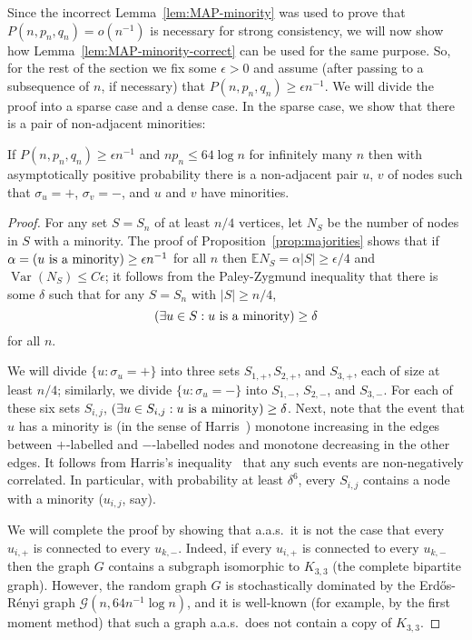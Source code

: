 \documentclass[EJP]{ejpecp}
\newcommand{\E}{\mathbb{E}}
\newcommand{\1}[1]{\mathbbm{1}_{\{#1\}}}
\newcommand{\calG}{\mathcal{G}}
\let\Pr\relax
\DeclareMathOperator{\Pr}{Pr}
\DeclareMathOperator{\Var}{Var}
\begin{document}
Since the incorrect Lemma~\ref{lem:MAP-minority} was used to prove that
$P(n, p_n, q_n) = o(n^{-1})$ is necessary for strong consistency, we will now show
how Lemma~\ref{lem:MAP-minority-correct} can be used for the same purpose.
So, for the rest of the section we fix some $\epsilon > 0$ and assume (after passing
to a subsequence of $n$, if necessary) that $P(n, p_n, q_n) \ge \epsilon n^{-1}$.
We will divide the proof into a sparse case and a dense case. In the sparse case,
we show that there is a pair of non-adjacent minorities:

\begin{lemma}\label{lem:erratum-sparse}
    If $P(n, p_n, q_n) \ge \epsilon n^{-1}$ and $n p_n \le 64 \log n$ for
    infinitely many $n$ then with asymptotically positive probability there is
    a non-adjacent pair $u$, $v$ of nodes such that $\sigma_u = +$, $\sigma_v =
    -$, and $u$ and $v$ have minorities.
\end{lemma}

\begin{proof}
    For any set $S = S_n$ of at least $n/4$ vertices, let $N_S$ be the number
    of nodes in $S$ with a minority. The proof of Proposition~\ref{prop:majorities}
    shows that if $\alpha = \Pr(u \text{ is a minority}) \ge \epsilon n^{-1}$
    for all $n$ then $\E N_S = \alpha |S| \ge \epsilon / 4$ and $\Var(N_S) \le C \epsilon$;
    it follows from the Paley-Zygmund inequality that there is some $\delta$ such
    that for any $S = S_n$ with $|S| \ge n/4$,
    \[
        \Pr(\exists u \in S: u \text{ is a minority}) \ge \delta
    \]
    for all $n$.

    We will divide $\{u: \sigma_u = +\}$ into three sets $S_{1,+}, S_{2,+}$,
    and $S_{3,+}$, each of size at least $n/4$; similarly, we divide $\{u: \sigma_u = -\}$
    into $S_{1,-}$, $S_{2,-}$, and $S_{3,-}$. For each of these six sets $S_{i,j}$,
    $\Pr(\exists u \in S_{i,j}: u \text{ is a minority}) \ge \delta$.
    Next, note that the event
    that $u$ has a minority is (in the sense of Harris~\cite{Harris:60})
    monotone increasing in the edges between $+$-labelled and $-$-labelled nodes
    and monotone decreasing in the other edges. It follows from Harris's
    inequality~\cite{Harris:60} that any such events are non-negatively correlated.
    In particular, with probability at least $\delta^6$, every $S_{i,j}$ contains a
    node with a minority ($u_{i,j}$, say).
    
    We will complete the proof by showing that a.a.s.\ it is not the case that
    every $u_{i,+}$ is connected to every $u_{k,-}$.  Indeed, if every
    $u_{i,+}$ is connected to every $u_{k,-}$ then the graph $G$ contains a
    subgraph isomorphic to $K_{3,3}$ (the complete bipartite graph).  However,
    the random graph $G$ is stochastically dominated by the Erd\H{o}s-R\'enyi
    graph $\calG(n,64 n^{-1} \log n)$, and it is well-known (for example, by
    the first moment method) that such a graph a.a.s.\ does not contain a copy
    of $K_{3,3}$.
\end{proof}
\end{document}
